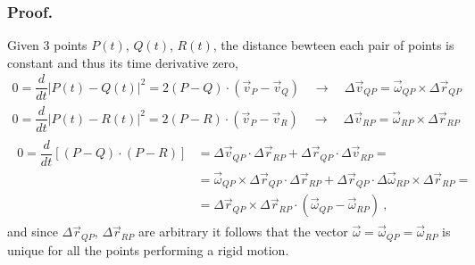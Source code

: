 \documentclass[letterpaper,10pt,english]{jupyterBook}
\begin{document}
\subsubsection*{Proof.}

\sphinxAtStartPar
Given 3 points \(P(t)\), \(Q(t)\), \(R(t)\), the distance bewteen each pair of points is constant and thus its time derivative zero,
\begin{equation*}
\begin{split}0 = \dfrac{d}{dt} |P(t)-Q(t)|^2 = 2 \left(P - Q\right) \cdot \left( \vec{v}_P - \vec{v}_Q \right) \quad \rightarrow \quad \Delta \vec{v}_{QP} = \vec{\omega}_{QP} \times \Delta \vec{r}_{QP}\end{split}
\end{equation*}\begin{equation*}
\begin{split}0 = \dfrac{d}{dt} |P(t)-R(t)|^2 = 2 \left(P - R\right) \cdot \left( \vec{v}_P - \vec{v}_R \right) \quad \rightarrow \quad \Delta \vec{v}_{RP} = \vec{\omega}_{RP} \times \Delta \vec{r}_{RP}\end{split}
\end{equation*}\begin{equation*}
\begin{split}\begin{aligned}
  0 = \dfrac{d}{dt} \left[ (P-Q) \cdot (P-R) \right] 
  & = \Delta \vec{v}_{QP} \cdot \Delta \vec{r}_{RP} + \Delta \vec{r}_{QP} \cdot \Delta \vec{v}_{RP} = \\
  & = \vec{\omega}_{QP} \times \Delta \vec{r}_{QP} \cdot \Delta \vec{r}_{RP} + \Delta \vec{r}_{QP} \cdot \Delta \vec{\omega}_{RP} \times \Delta \vec{r}_{RP} = \\
  & = \Delta \vec{r}_{QP} \times \Delta \vec{r}_{RP} \cdot ( \vec{\omega}_{QP} - \vec{\omega}_{RP} ) \ ,
\end{aligned}\end{split}
\end{equation*}
\sphinxAtStartPar
and since \(\Delta \vec{r}_{QP}\), \(\Delta \vec{r}_{RP}\) are arbitrary it follows that the vector \(\vec{\omega} = \vec{\omega}_{QP} = \vec{\omega}_{RP}\) is unique for all the points performing a rigid motion.
\end{document}
